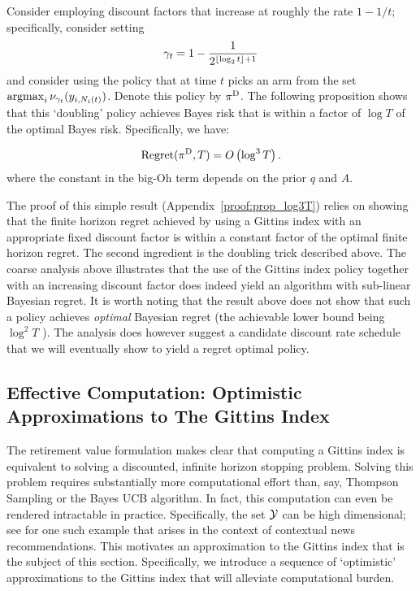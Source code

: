 Consider employing discount factors that increase at roughly the rate $1 - 1/t$; specifically, consider setting 
\[
\gamma_t = 
1 - 
\frac{1}
{2^{\lfloor\log_2 t\rfloor+1}}
\]
and consider using the policy that at time $t$ picks an arm from the set $\operatorname*{\mathrm{argmax}}_i \nu_{\gamma_t}(y_{i,N_i(t)})$. Denote this policy by $\pi^{\rm D}$. The following proposition shows that this `doubling' policy achieves Bayes risk that is within a factor of $\log T$ of the optimal Bayes risk. Specifically, we have:
\begin{proposition}
	\label{prop:gittins_log3T}
	\[
	{\rm Regret}(\pi^{\rm D},T)
	=
	O
	\left(
	\log^3 T
	\right).
	\] 
	where the constant in the big-Oh term depends on the prior $q$ and $A$.
\end{proposition}
The proof of this simple result (Appendix~\ref{proof:prop_log3T}) relies on showing that the finite horizon regret achieved by using a Gittins index with an appropriate fixed discount factor is within a constant factor of the optimal finite horizon regret. The second ingredient is the doubling trick described above. The coarse analysis above illustrates that the use of the Gittins index policy together with an increasing discount factor does indeed yield an algorithm with sub-linear Bayesian regret. It is worth noting that the result above does not show that such a policy achieves {\em optimal} Bayesian regret (the achievable lower bound being $\log^2T$ \citep{lai1987adaptive}). The analysis does however suggest a candidate discount rate schedule that we will eventually show to yield a regret optimal policy. 
 
\subsection{Effective Computation: Optimistic Approximations to The Gittins Index}\label{sec:approx_agi_deriv}

The retirement value formulation makes clear that computing a Gittins index is equivalent to solving a discounted, infinite horizon stopping problem. Solving this problem requires substantially more computational effort than, say, Thompson Sampling or the Bayes UCB algorithm. In fact, this computation can even be rendered intractable in practice. Specifically, the set $\mathcal Y$ can be high dimensional; see \cite{chapelle2011empirical} for one such example that arises in the context of contextual news recommendations. This motivates an approximation to the Gittins index that is the subject of this section. Specifically, we introduce a sequence of `optimistic' approximations to the Gittins index that will alleviate computational burden. 

